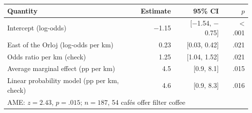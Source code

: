 \begin{tabular}{lrrr}
\toprule
Quantity & Estimate & 95\% CI & $p$ \\
\midrule
Intercept (log-odds) & \ensuremath{-}1.15 & [\ensuremath{-}1.54, \ensuremath{-}0.75] & < .001 \\
East of the Orloj (log-odds per km) & 0.23 & [0.03, 0.42] & .021 \\
\midrule
Odds ratio per km (check) & 1.25 & [1.04, 1.52] & .021 \\
Average marginal effect (pp per km) & 4.5 & [0.9, 8.1] & .015 \\
Linear probability model (pp per km, check) & 4.6 & [0.9, 8.3] & .016 \\
\midrule
\multicolumn{4}{l}{AME: $z = 2.43$, $p = .015$; $n = 187$, 54 caf\'es offer filter coffee} \\
\bottomrule
\end{tabular}
